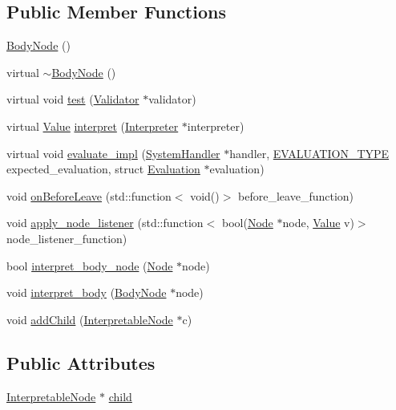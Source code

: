 \subsection*{Public Member Functions}
\begin{DoxyCompactItemize}
\item 
\hyperlink{classBodyNode_ac431b406e16e66745f5413eb868f23b8}{Body\+Node} ()
\item 
virtual \hyperlink{classBodyNode_acf86c2f7982224510b39a5f35de0bbde}{$\sim$\+Body\+Node} ()
\item 
virtual void \hyperlink{classBodyNode_a80e75b0ab6c388c34a82bdce63fdc7bb}{test} (\hyperlink{classValidator}{Validator} $\ast$validator)
\item 
virtual \hyperlink{classValue}{Value} \hyperlink{classBodyNode_a5ab94984d059dba1f7d2baa6022712ba}{interpret} (\hyperlink{classInterpreter}{Interpreter} $\ast$interpreter)
\item 
virtual void \hyperlink{classBodyNode_ab08c6586b725065afca095786b842991}{evaluate\+\_\+impl} (\hyperlink{classSystemHandler}{System\+Handler} $\ast$handler, \hyperlink{statics_8h_a6664c451ca7787483a7981cc1de68dbb}{E\+V\+A\+L\+U\+A\+T\+I\+O\+N\+\_\+\+T\+Y\+PE} expected\+\_\+evaluation, struct \hyperlink{structEvaluation}{Evaluation} $\ast$evaluation)
\item 
void \hyperlink{classBodyNode_a8b27949f189186af47dd81336d0d5ce7}{on\+Before\+Leave} (std\+::function$<$ void()$>$ before\+\_\+leave\+\_\+function)
\item 
void \hyperlink{classBodyNode_adf1536979d1a57a735cc75290117afa4}{apply\+\_\+node\+\_\+listener} (std\+::function$<$ bool(\hyperlink{classNode}{Node} $\ast$node, \hyperlink{classValue}{Value} v)$>$ node\+\_\+listener\+\_\+function)
\item 
bool \hyperlink{classBodyNode_a7019e16f431cbf8975b1fde622d47d77}{interpret\+\_\+body\+\_\+node} (\hyperlink{classNode}{Node} $\ast$node)
\item 
void \hyperlink{classBodyNode_a9b6bafc8338e35a034aff1a23d519b1e}{interpret\+\_\+body} (\hyperlink{classBodyNode}{Body\+Node} $\ast$node)
\item 
void \hyperlink{classBodyNode_ab8a99f9e2c7d33f7cf4cbb07a61bec0f}{add\+Child} (\hyperlink{classInterpretableNode}{Interpretable\+Node} $\ast$c)
\end{DoxyCompactItemize}
\subsection*{Public Attributes}
\begin{DoxyCompactItemize}
\item 
\hyperlink{classInterpretableNode}{Interpretable\+Node} $\ast$ \hyperlink{classBodyNode_a6b18b29807903661a9f06e865331fca4}{child}
\end{DoxyCompactItemize}
